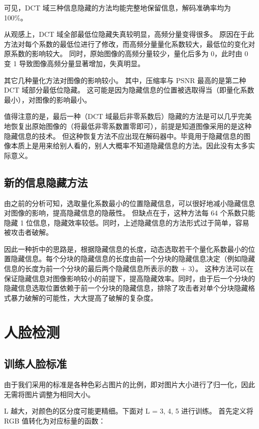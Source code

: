 \documentclass[a4paper]{article}  %
\begin{document}
可见，DCT 域三种信息隐藏的方法均能完整地保留信息，解码准确率均为 100\%。

从观感上，DCT 域全部最低位隐藏失真较明显，高频分量变得很多。
原因在于此方法对每个系数的最低位进行了修改，而高频分量量化系数较大，最低位的变化对原系数的影响较大。
同时，原始图像的高频分量较少，量化后多为 0，此时由 0 变 1 导致图像高频分量显著增加，失真明显。

其它几种量化方法对图像的影响较小。
其中，压缩率与 PSNR 最高的是第二种 DCT 域部分最低位隐藏。
这可能是因为隐藏信息的位置被选取得当（即量化系数最小），对图像的影响最小。

值得注意的是，最后一种（DCT 域最后非零系数后）隐藏的方法是可以几乎完美地恢复出原始图像的（将最低非零系数置零即可），前提是知道图像采用的是这种隐藏信息的技术。
但这种恢复方法不应出现在解码器中。毕竟用于隐藏信息的图像本质上是用来给别人看的，别人大概率不知道隐藏信息的方法。因此没有太多实际意义。

\subsection{新的信息隐藏方法}

由之前的分析可知，选取量化系数最小的位置隐藏信息，可以很好地减小隐藏信息对图像的影响，提高隐藏信息的隐蔽性。
但缺点在于，这种方法每 64 个系数只能隐藏 1 位信息，隐藏效率较低。同时，上述隐藏信息的方法形式过于简单，容易被攻击者破解。

因此一种折中的思路是，根据隐藏信息的长度，动态选取若干个量化系数最小的位置隐藏信息。每个分块的隐藏信息的长度由前一个分块的隐藏信息决定（例如隐藏信息的长度为前一个分块的最后两个隐藏信息所表示的数 + 3）。
这种方法可以在保证隐藏信息对图像影响较小的前提下，提高隐藏效率。同时，由于后一个分块的隐藏信息选取位置依赖于前一个分块的隐藏信息，排除了攻击者对单个分块隐藏格式暴力破解的可能性，大大提高了破解的复杂度。


\section{人脸检测}

\subsection{训练人脸标准}

由于我们采用的标准是各种色彩占图片的比例，即对图片大小进行了归一化，因此无需将图片调整为相同大小。

L 越大，对颜色的区分度可能更精细。下面对 L = 3, 4, 5 进行训练。
首先定义将 RGB 值转化为对应标量的函数：
\end{document}
